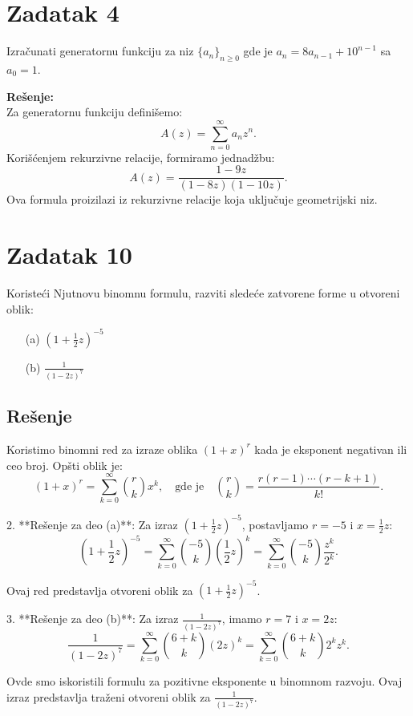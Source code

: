\documentclass{article}
\begin{document}
\section*{Zadatak 4}
Izračunati generatornu funkciju za niz $\{a_n\}_{n \geq 0}$ gde je $a_n = 8a_{n-1} + 10^{n-1}$ sa $a_0 = 1$.

\textbf{Rešenje:} \\
Za generatornu funkciju definišemo:
\[
A(z) = \sum_{n=0}^{\infty} a_n z^n.
\]
Korišćenjem rekurzivne relacije, formiramo jednadžbu:
\[
A(z) = \frac{1 - 9z}{(1 - 8z)(1 - 10z)}.
\]
Ova formula proizilazi iz rekurzivne relacije koja uključuje geometrijski niz.

\section*{Zadatak 10}

Koristeći Njutnovu binomnu formulu, razviti sledeće zatvorene forme u otvoreni oblik:

\begin{itemize}
    \item[(a)] \( \left( 1 + \frac{1}{2} z \right)^{-5} \)
    \item[(b)] \( \frac{1}{(1 - 2z)^7} \)
\end{itemize}

\subsection*{Rešenje}

   Koristimo binomni red za izraze oblika \( (1 + x)^r \) kada je eksponent negativan ili ceo broj. Opšti oblik je:
   \begin{equation*}
   (1 + x)^r = \sum_{k=0}^{\infty} \binom{r}{k} x^k, \quad \text{gde je} \quad \binom{r}{k} = \frac{r (r-1) \cdots (r-k+1)}{k!}.
   \end{equation*}

2. **Rešenje za deo (a)**: 
   Za izraz \( \left( 1 + \frac{1}{2} z \right)^{-5} \), postavljamo \( r = -5 \) i \( x = \frac{1}{2} z \):
   \begin{equation*}
   \left( 1 + \frac{1}{2} z \right)^{-5} = \sum_{k=0}^{\infty} \binom{-5}{k} \left( \frac{1}{2} z \right)^k = \sum_{k=0}^{\infty} \binom{-5}{k} \frac{z^k}{2^k}.
   \end{equation*}
   
   Ovaj red predstavlja otvoreni oblik za \( \left( 1 + \frac{1}{2} z \right)^{-5} \).

3. **Rešenje za deo (b)**: 
   Za izraz \( \frac{1}{(1 - 2z)^7} \), imamo \( r = 7 \) i \( x = 2z \):
   \begin{equation*}
   \frac{1}{(1 - 2z)^7} = \sum_{k=0}^{\infty} \binom{6+k}{k} (2z)^k = \sum_{k=0}^{\infty} \binom{6+k}{k} 2^k z^k.
   \end{equation*}

   Ovde smo iskoristili formulu za pozitivne eksponente u binomnom razvoju. Ovaj izraz predstavlja traženi otvoreni oblik za \( \frac{1}{(1 - 2z)^7} \).
\end{document}
